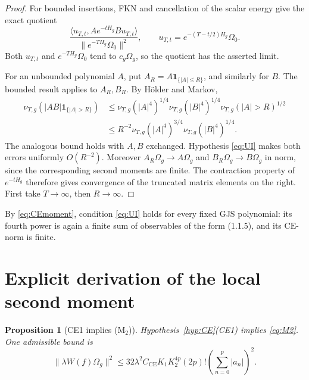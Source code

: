 \documentclass[11pt,a4paper]{article}
\newtheorem{proposition}[theorem]{Proposition}
\theoremstyle{remark}
\newcommand{\Om}{\Omega}
\newcommand{\CE}{\mathrm{CE}}
\begin{document}
\begin{proof}
For bounded insertions, FKN and cancellation of the scalar energy give the exact quotient
\[
 \frac{\langle u_{T,t},Ae^{-tH_g}Bu_{T,t}\rangle}
      {\|e^{-TH_g}\Om_0\|^2},
 \qquad u_{T,t}=e^{-(T-t/2)H_g}\Om_0.
\]
Both $u_{T,t}$ and $e^{-TH_g}\Om_0$ tend to $c_g\Om_g$, so the quotient has the asserted limit.

For an unbounded polynomial $A$, put $A_R=A\mathbf1_{\{|A|\le R\}}$, and similarly for $B$.
The bounded result applies to $A_R,B_R$.  By H\"older and Markov,
\begin{align*}
 \nu_{T,g}(|AB|\mathbf1_{\{|A|>R\}})
 &\le \nu_{T,g}(|A|^4)^{1/4}\nu_{T,g}(|B|^4)^{1/4}
       \nu_{T,g}(|A|>R)^{1/2}\\
 &\le R^{-2}\nu_{T,g}(|A|^4)^{3/4}\nu_{T,g}(|B|^4)^{1/4}.
\end{align*}
The analogous bound holds with $A,B$ exchanged.  Hypothesis \eqref{eq:UI} makes both errors
uniformly $O(R^{-2})$.  Moreover $A_R\Om_g\to A\Om_g$ and
$B_R\Om_g\to B\Om_g$ in norm, since the corresponding second moments are finite.  The
contraction property of $e^{-tH_g}$ therefore gives convergence of the truncated matrix
elements on the right.  First take $T\to\infty$, then $R\to\infty$.
\end{proof}

By \eqref{eq:CEmoment}, condition \eqref{eq:UI} holds for every fixed GJS polynomial: its fourth
power is again a finite sum of observables of the form (1.1.5), and its $\CE$-norm is finite.

\section{Explicit derivation of the local second moment}

\begin{proposition}[CE1 implies (M$_2$)]\label{prop:M2}
Hypothesis~\ref{hyp:CE}(CE1) implies \eqref{eq:M2}.  One admissible bound is
\begin{equation}\label{eq:Mexplicit}
 \|\lambda W(f)\Om_g\|^2
 \le 32\lambda^2 C_{\CE}K_1K_2^{4p}(2p)!
       \left(\sum_{n=0}^p|a_n|\right)^2.                            \tag{4.1}
\end{equation}
\end{proposition}
\end{document}
